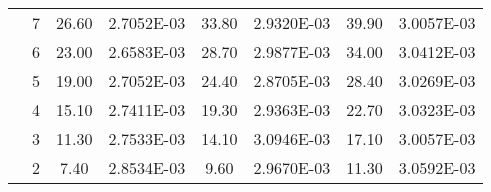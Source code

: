 \begin{table}
\begin{tabular}{|rr|r|r|r|r|r|r|}
  \cline{2-8}    \rowcolor[rgb]{ .788,  .788,  .788} \multicolumn{1}{|c|}{} & \multicolumn{1}{c|}{\cellcolor[rgb]{ 1,  1,  1}7} & \multicolumn{1}{c|}{\cellcolor[rgb]{ 1,  1,  1}26.60} & \cellcolor[rgb]{ 1,  1,  1}2.7052E-03 & \multicolumn{1}{c|}{\cellcolor[rgb]{ 1,  1,  1}33.80} & \cellcolor[rgb]{ 1,  1,  1}2.9320E-03 & \multicolumn{1}{c|}{\cellcolor[rgb]{ 1,  1,  1}39.90} & \cellcolor[rgb]{ 1,  1,  1}3.0057E-03 \bigstrut\\
  \cline{2-8}    \rowcolor[rgb]{ .788,  .788,  .788} \multicolumn{1}{|c|}{} & \multicolumn{1}{c|}{\cellcolor[rgb]{ 1,  1,  1}6} & \multicolumn{1}{c|}{\cellcolor[rgb]{ 1,  1,  1}23.00} & \cellcolor[rgb]{ 1,  1,  1}2.6583E-03 & \multicolumn{1}{c|}{\cellcolor[rgb]{ 1,  1,  1}28.70} & \cellcolor[rgb]{ 1,  1,  1}2.9877E-03 & \multicolumn{1}{c|}{\cellcolor[rgb]{ 1,  1,  1}34.00} & \cellcolor[rgb]{ 1,  1,  1}3.0412E-03 \bigstrut\\
  \cline{2-8}    \rowcolor[rgb]{ .788,  .788,  .788} \multicolumn{1}{|c|}{} & \multicolumn{1}{c|}{\cellcolor[rgb]{ 1,  1,  1}5} & \multicolumn{1}{c|}{\cellcolor[rgb]{ 1,  1,  1}19.00} & \cellcolor[rgb]{ 1,  1,  1}2.7052E-03 & \multicolumn{1}{c|}{\cellcolor[rgb]{ 1,  1,  1}24.40} & \cellcolor[rgb]{ 1,  1,  1}2.8705E-03 & \multicolumn{1}{c|}{\cellcolor[rgb]{ 1,  1,  1}28.40} & \cellcolor[rgb]{ 1,  1,  1}3.0269E-03 \bigstrut\\
  \cline{2-8}    \rowcolor[rgb]{ .788,  .788,  .788} \multicolumn{1}{|c|}{} & \multicolumn{1}{c|}{\cellcolor[rgb]{ 1,  1,  1}4} & \multicolumn{1}{c|}{\cellcolor[rgb]{ 1,  1,  1}15.10} & \cellcolor[rgb]{ 1,  1,  1}2.7411E-03 & \multicolumn{1}{c|}{\cellcolor[rgb]{ 1,  1,  1}19.30} & \cellcolor[rgb]{ 1,  1,  1}2.9363E-03 & \multicolumn{1}{c|}{\cellcolor[rgb]{ 1,  1,  1}22.70} & \cellcolor[rgb]{ 1,  1,  1}3.0323E-03 \bigstrut\\
  \cline{2-8}    \rowcolor[rgb]{ .788,  .788,  .788} \multicolumn{1}{|c|}{} & \multicolumn{1}{c|}{\cellcolor[rgb]{ 1,  1,  1}3} & \multicolumn{1}{c|}{\cellcolor[rgb]{ 1,  1,  1}11.30} & \cellcolor[rgb]{ 1,  1,  1}2.7533E-03 & \multicolumn{1}{c|}{\cellcolor[rgb]{ 1,  1,  1}14.10} & \cellcolor[rgb]{ 1,  1,  1}3.0946E-03 & \multicolumn{1}{c|}{\cellcolor[rgb]{ 1,  1,  1}17.10} & \cellcolor[rgb]{ 1,  1,  1}3.0057E-03 \bigstrut\\
  \cline{2-8}    \rowcolor[rgb]{ .788,  .788,  .788} \multicolumn{1}{|c|}{} & \multicolumn{1}{c|}{\cellcolor[rgb]{ 1,  1,  1}2} & \multicolumn{1}{c|}{\cellcolor[rgb]{ 1,  1,  1}7.40} & \cellcolor[rgb]{ 1,  1,  1}2.8534E-03 & \multicolumn{1}{c|}{\cellcolor[rgb]{ 1,  1,  1}9.60} & \cellcolor[rgb]{ 1,  1,  1}2.9670E-03 & \multicolumn{1}{c|}{\cellcolor[rgb]{ 1,  1,  1}11.30} & \cellcolor[rgb]{ 1,  1,  1}3.0592E-03 \bigstrut\\

\end{tabular}
\end{table}
